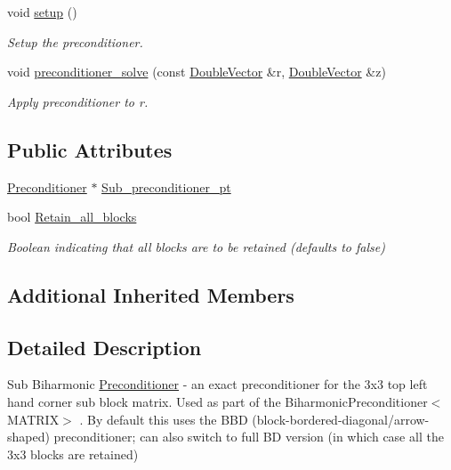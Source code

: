 \begin{DoxyCompactItemize}
void \hyperlink{classoomph_1_1ExactSubBiharmonicPreconditioner_af2c9a65ab49cdc6dd0b0d5339833c407}{setup} ()
\begin{DoxyCompactList}\small\item\em Setup the preconditioner. \end{DoxyCompactList}\item 
void \hyperlink{classoomph_1_1ExactSubBiharmonicPreconditioner_aaf4493aaa8dcd46cf585b7585d246ad0}{preconditioner\+\_\+solve} (const \hyperlink{classoomph_1_1DoubleVector}{Double\+Vector} \&r, \hyperlink{classoomph_1_1DoubleVector}{Double\+Vector} \&z)
\begin{DoxyCompactList}\small\item\em Apply preconditioner to r. \end{DoxyCompactList}\end{DoxyCompactItemize}
\subsection*{Public Attributes}
\begin{DoxyCompactItemize}
\item 
\hyperlink{classoomph_1_1Preconditioner}{Preconditioner} $\ast$ \hyperlink{classoomph_1_1ExactSubBiharmonicPreconditioner_aa6ff92b55858721d83cf933d39484ed3}{Sub\+\_\+preconditioner\+\_\+pt}
\item 
bool \hyperlink{classoomph_1_1ExactSubBiharmonicPreconditioner_aa70a47f3675b510ae74ae11b86648f93}{Retain\+\_\+all\+\_\+blocks}
\begin{DoxyCompactList}\small\item\em Boolean indicating that all blocks are to be retained (defaults to false) \end{DoxyCompactList}\end{DoxyCompactItemize}
\subsection*{Additional Inherited Members}


\subsection{Detailed Description}
Sub Biharmonic \hyperlink{classoomph_1_1Preconditioner}{Preconditioner} -\/ an exact preconditioner for the 3x3 top left hand corner sub block matrix. Used as part of the Biharmonic\+Preconditioner$<$\+M\+A\+T\+R\+I\+X$>$ . By default this uses the B\+BD (block-\/bordered-\/diagonal/arrow-\/shaped) preconditioner; can also switch to full BD version (in which case all the 3x3 blocks are retained) 

